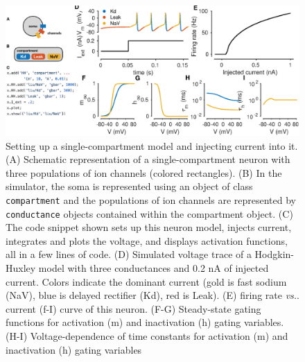 \documentclass{frontiersSCNS} %
\newcommand{\vs}{\textit{vs.}\xspace}
\begin{document}
\begin{figure}
	\centering
	\includegraphics[width=1.0\linewidth]{gfx/figure_HH}
	\caption{Setting up a single-compartment model and injecting current into it. (A) Schematic representation of a single-compartment neuron with three populations of ion channels (colored rectangles). (B) In the simulator, the soma is represented using an object of class \texttt{compartment} and the populations of ion channels are represented by \texttt{conductance} objects contained within the compartment object. (C) The code snippet shown sets up this neuron model, injects current, integrates and plots the voltage, and displays activation functions, all in a few lines of code. (D) Simulated voltage trace of a Hodgkin-Huxley model with three conductances and 0.2 nA of injected current. Colors indicate the dominant current (gold is fast sodium (NaV), blue is delayed rectifier (Kd), red is Leak). (E) firing rate \vs. current (f-I) curve of this neuron. (F-G) Steady-state gating functions for activation (m) and inactivation (h) gating variables. (H-I) Voltage-dependence of time constants for activation (m) and inactivation (h) gating variables}
	\label{fig:figurehh}
\end{figure}
\end{document}
